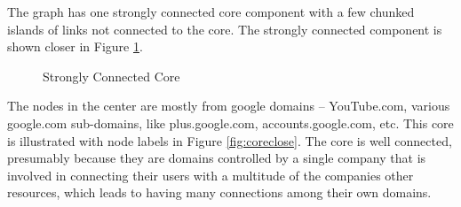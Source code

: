 \clearpage

The graph has one strongly connected core component with a few chunked islands of links not connected to the core. The strongly connected component is shown closer in Figure \ref{fig:core}.

\begin{figure}[h!]
\centering
{}
\caption{Strongly Connected Core}
\label{fig:core}
\end{figure}

The nodes in the center are mostly from google domains -- YouTube.com, various google.com sub-domains, like plus.google.com, accounts.google.com, etc. This core is illustrated with node labels in Figure \ref{fig:coreclose}. The core is well connected, presumably because they are domains controlled by a single company that is involved in connecting their users with a multitude of the companies other resources, which leads to having many connections among their own domains. 

